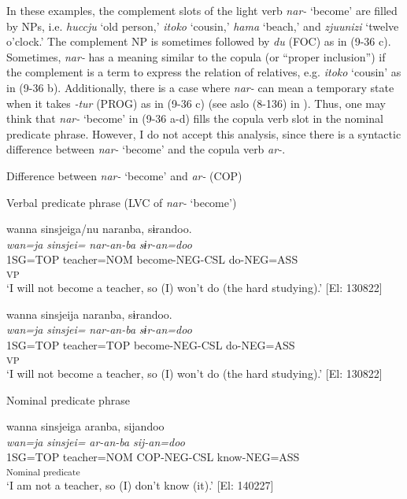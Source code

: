 In these examples, the complement slots of the light verb \textit{nar-} ‘become’ are filled by NPs, i.e. \textit{huccju} ‘old person,’ \textit{itoko} ‘cousin,’ \textit{hama} ‘beach,’ and \textit{zjuunizi} ‘twelve o’clock.’ The complement NP is sometimes followed by \textit{du} (FOC) as in (9-36 c). Sometimes, \textit{nar-} has a meaning similar to the copula (or “proper inclusion”) \citep[114]{Payne1997} if the complement is a term to express the relation of relatives, e.g. \textit{itoko} ‘cousin’ as in (9-36 b). Additionally, there is a case where \textit{nar-} can mean a temporary state when it takes \textit{{}-tur} (PROG) as in (9-36 c) (see aslo (8-136) in ). Thus, one may think that \textit{nar-} ‘become’ in (9-36 a-d) fills the copula verb slot in the nominal predicate phrase. However, I do not accept this analysis, since there is a syntactic difference between \textit{nar-} ‘become’ and the copula verb \textit{ar-}.

\ea   Difference between \textit{nar-} ‘become’ and \textit{ar-} (COP) \label{ex:9.37}

 \exi{} Verbal predicate phrase (LVC of \textit{nar-} ‘become’)

\ea %
 \gllll  *wanna  sinsjeiga/nu  naranba,  sɨrandoo.\\
       \textit{wan=ja}  \textit{sinsjei=}  \textit{nar-an-ba}  \textit{sɨr-an=doo}\\
       1SG=TOP  teacher=NOM  become-NEG-CSL  do-NEG=ASS\\
        [Complement  LV]\textsubscript{VP}  \\
       ‘I will not become a teacher, so (I) won’t do (the hard studying).’ [El: 130822]

\ex \label{ex:9.37b} %
    \gllll  wanna  sinsjeija  naranba,  sɨrandoo.\\
       \textit{wan=ja}  \textit{sinsjei=}  \textit{nar-an-ba}  \textit{sɨr-an=doo}\\
       1SG=TOP  teacher=TOP  become-NEG-CSL  do-NEG=ASS\\
        [Complement  LV]\textsubscript{VP}  \\
      \glt        ‘I will not become a teacher, so (I) won’t do (the hard studying).’ [El: 130822]

\exi{}  Nominal predicate phrase

\ex \label{ex:9.37c} %
    \gllll  wanna  sinsjeiga  aranba,  sijandoo\\
       \textit{wan=ja}  \textit{sinsjei=}  \textit{ar-an-ba}  \textit{sij-an=doo}\\
       1SG=TOP  teacher=NOM  COP-NEG-CSL  know-NEG=ASS\\
        [NP  Copula verb]\textsubscript{Nominal predicate}  \\
      \glt        ‘I am not a teacher, so (I) don’t know (it).’ [El: 140227]
    \z
\z

